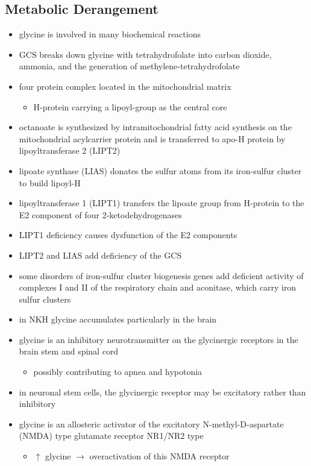 \documentclass{scrartcl}
\begin{document}
\subsection{Metabolic Derangement}
\label{sec:orgab31be2}
\begin{itemize}
\item glycine is involved in many biochemical reactions
\item GCS breaks down glycine with tetrahydrofolate into carbon dioxide,
ammonia, and the generation of methylene-tetrahydrofolate
\item four protein complex located in the mitochondrial matrix
\begin{itemize}
\item H-protein carrying a lipoyl-group as the central core
\end{itemize}
\item octanoate is synthesized by intramitochondrial fatty acid synthesis
on the mitochondrial acylcarrier protein and is transferred to apo-H
protein by lipoyltransferase 2 (LIPT2)
\item lipoate synthase (LIAS) donates the sulfur atoms from its
iron-sulfur cluster to build lipoyl-H
\item lipoyltransferase 1 (LIPT1) transfers the lipoate group from
H-protein to the E2 component of four 2-ketodehydrogenases
\item LIPT1 deficiency causes dysfunction of the E2 components
\item LIPT2 and LIAS add deficiency of the GCS
\item some disorders of iron-sulfur cluster biogenesis genes add deficient
activity of complexes I and II of the respiratory chain and
aconitase, which carry iron sulfur clusters
\item in NKH glycine accumulates particularly in the brain
\item glycine is an inhibitory neurotransmitter on the glycinergic
receptors in the brain stem and spinal cord
\begin{itemize}
\item possibly contributing to apnea and hypotonia
\end{itemize}
\item in neuronal stem cells, the glycinergic receptor may be excitatory
rather than inhibitory
\item glycine is an allosteric activator of the excitatory
N-methyl-D-aspartate (NMDA) type glutamate receptor NR1/NR2 type
\begin{itemize}
\item \(\uparrow\) glycine \(\to\) overactivation of this NMDA receptor
\end{itemize}
\end{itemize}
\end{document}
